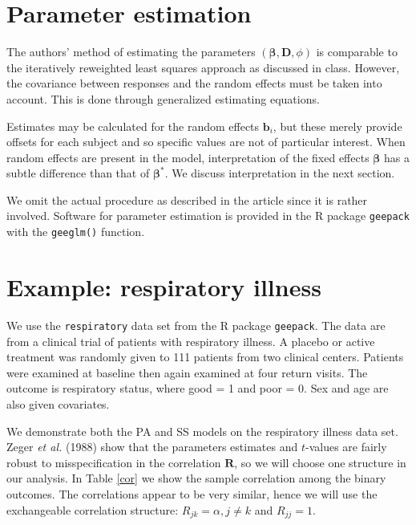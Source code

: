 \documentclass[12pt]{article}
\newcommand{\m}[1]{\mathbf{\bm{#1}}}
\begin{document}
\section*{Parameter estimation}

\noindent The authors' method of estimating the parameters $(\m{\beta},\m{D},\phi)$ is comparable to the iteratively reweighted least squares approach as discussed in class. However, the covariance between responses and the random effects must be taken into account. This is done through generalized estimating equations.
\bigskip

\noindent Estimates may be calculated for the random effects $\m{b}_i$, but these merely provide offsets for each subject and so specific values are not of particular interest. When random effects are present in the model, interpretation of the fixed effects $\m{\beta}$ has a subtle difference than that of $\m{\beta}^*$. We discuss interpretation in the next section.
\bigskip

\noindent We omit the actual procedure as described in the article since it is rather involved. Software for parameter estimation is provided in the R package \texttt{geepack} with the \texttt{geeglm()} function.

\section*{Example: respiratory illness}

\noindent We use the \texttt{respiratory} data set from the R package \texttt{geepack}. The data are from a clinical trial of patients with respiratory illness. A placebo or active treatment was randomly given to 111 patients from two clinical centers. Patients were examined at baseline then again examined at four return visits. The outcome is respiratory status, where good = 1 and poor = 0. Sex and age are also given covariates.
\bigskip

\noindent We demonstrate both the PA and SS models on the respiratory illness data set. Zeger \emph{et al.} (1988) show that the parameters estimates and $t$-values are fairly robust to misspecification in the correlation $\m{R}$, so we will choose one structure in our analysis. In Table \ref{cor} we show the sample correlation among the binary outcomes. The correlations appear to be very similar, hence we will use the exchangeable correlation structure: $R_{jk} = \alpha, j\neq k$ and $R_{jj} = 1$.
\end{document}
